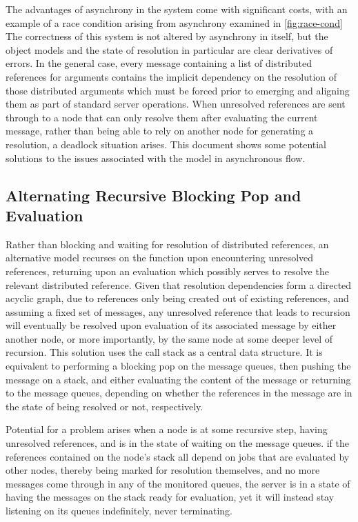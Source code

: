 The advantages of asynchrony in the system come with significant costs, with an example of a race condition arising from asynchrony examined in \cref{fig:race-cond} The correctness of this system is not altered by asynchrony in itself, but the object models and the state of resolution in particular are clear derivatives of errors.
In the general case, every message containing a list of distributed references for arguments contains the implicit dependency on the resolution of those distributed arguments which must be forced prior to emerging and aligning them as part of standard server operations.
When unresolved references are sent through to a node that can only resolve them after evaluating the current message, rather than being able to rely on another node for generating a resolution, a deadlock situation arises.
This document shows some potential solutions to the issues associated with the model in asynchronous flow.

\subsection{Alternating Recursive Blocking Pop and Evaluation} \label{recurs-stack}
Rather than blocking and waiting for resolution of distributed references, an alternative model recurses on the  function upon encountering unresolved references, returning upon an evaluation which possibly serves to resolve the relevant distributed reference.
Given that resolution dependencies form a directed acyclic graph, due to references only being created out of existing references, and assuming a fixed set of messages, any unresolved reference that leads to recursion will eventually be resolved upon evaluation of its associated message by either another node, or more importantly, by the same node at some deeper level of recursion.
This solution uses the call stack as a central data structure.
It is equivalent to performing a blocking pop on the message queues, then pushing the message on a stack, and either evaluating the content of the message or returning to the message queues, depending on whether the references in the message are in the state of being resolved or not, respectively.

Potential for a problem arises when a node is at some recursive step, having unresolved references, and is in the state of waiting on the message queues.
if the references contained on the node's stack all depend on jobs that are
evaluated by other nodes, thereby being marked for resolution themselves, and
no more messages come through in any of the monitored queues, the server is in
a state of having the messages on the stack ready for evaluation, yet it will
instead stay listening on its queues indefinitely, never terminating.

